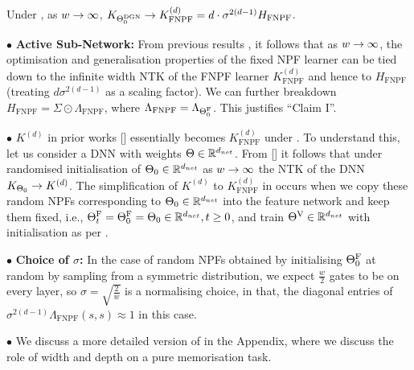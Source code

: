 \begin{theorem}\label{th:main} Under , as $w\rightarrow\infty$, $K_{\Theta^{\text{DGN}}_0}\rightarrow K^{(d)}_{\text{FNPF}} =d\cdot \sigma^{2(d-1)} H_{\text{FNPF}}$.%
\end{theorem}
\begin{comment}
\begin{theorem}\label{th:main} Let be $H_{\Tg_0}\stackrel{def}= \Phi^\top_{\Tg_0}\Phi_{\Tg_0}$ be the NPK matrix. As $w\ra\infty$, $K_{\Tdgn_0}\ra d \sigma^{2(d-1)} H_{\Tg_0} $.
\end{theorem}
\end{comment}
$\bullet$ \textbf{Active Sub-Network:} From previous results \cite{arora2019exact}, it follows that as $w\rightarrow\infty$, the optimisation and generalisation properties of the fixed NPF learner can be tied down to the infinite width NTK of the FNPF learner $K^{(d)}_{\text{FNPF}}$ and hence to $H_{\text{FNPF}}$ (treating $d\sigma^{2(d-1)}$ as a scaling factor).  We can further breakdown $H_{\text{FNPF}}=\Sigma\odot{\Lambda}_{\text{FNPF}}$, where $\Lambda_{\text{FNPF}}=\Lambda_{{\Theta}^{\text{F}}_0}$. This justifies ``Claim I''. 

$\bullet$ $K^{(d)}$ in prior works [] essentially becomes $K^{(d)}_{\text{FNPF}}$ under .  To understand this, let us consider a DNN with weights $\Theta\in\mathbb{R}^{d_{net}}$. From  [] it follows that under randomised initialisation of $\Theta_0\in\mathbb{R}^{d_{net}}$ as $w\rightarrow\infty$ the NTK of the DNN  $K_{\Theta_0}\rightarrow K^{(d)}$. The simplification of $K^{(d)}$ to $K^{(d)}_{\text{FNPF}}$ in  occurs when we copy these random NPFs corresponding to $\Theta_0\in\mathbb{R}^{d_{net}}$ into the feature network and keep them fixed, i.e., ${\Theta}^{\text{F}}_t={\Theta}^{\text{F}}_0=\Theta_0\in\mathbb{R}^{d_{net}},t\geq 0$, and train ${\Theta}^{\text{V}}\in\mathbb{R}^{d_{net}}$ with initialisation as per .
 
 $\bullet$ \textbf{Choice of $\sigma$:} In the case of random NPFs obtained by initialising ${\Theta}^{\text{F}}_0$ at random by sampling from a symmetric distribution, we expect $\frac{w}2$ gates to be on every layer, so $\sigma=\sqrt{\frac{2}{w}}$ is a normalising choice, in that, the diagonal entries of $\sigma^{2(d-1)}{\Lambda}_{\text{FNPF}}(s,s)\approx 1$ in this case.

$\bullet$ We discuss a more detailed version of  in the Appendix, where we discuss the role of width and depth on a pure memorisation task.

